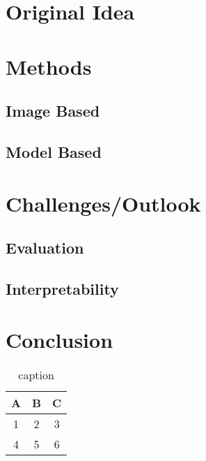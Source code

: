 \documentclass{seminar}
\begin{document}
\section{Original Idea}

\section{Methods}
\subsection{Image Based}
\subsection{Model Based}

\section*{Challenges/Outlook}
\subsection{Evaluation}
\subsection{Interpretability}






\section{Conclusion}





  \begin{table}
  \caption{caption}
  \begin{tabular}{|c|c|c|}
\hline
 A & B & C \\
\hline
 1 & 2 & 3  \\
\hline 
 4 & 5 & 6 \\
\hline
\end{tabular}
  \end{table}


\newpage






\end{document}
